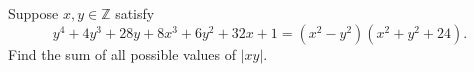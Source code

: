 Suppose $x,y\in\mathbb{Z}$ satisfy$$y^4+4y^3+28y+8x^3+6y^2+32x+1=(x^2-y^2)(x^2+y^2+24).$$Find the sum of all possible values of $|xy|$.